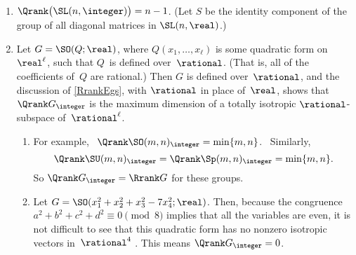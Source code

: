 \begin{egs} \ \label{QrankEg} 
 \noprelistbreak
	 \begin{enumerate}
	 
	 \item \label{QrankEg-SL}
	 $\Qrank \bigl( \SL(n,\integer) \bigr) = n-1$. (Let $S$ be the identity component of the group of all diagonal matrices in $\SL(n,\real)$.)
	
	 \item \label{QrankEg-SOQ}
	 Let $G = \SO(Q; \real)$, where $Q(x_1,\ldots,x_\ell)$
	is some quadratic form on~$\real^\ell$, such that $Q$~is
	defined over~$\rational$. (That is, all of the coefficients
	of~$Q$ are rational.) Then $G$ is defined over~$\rational$,
	and the discussion of \cref{RrankEgs}, with $\rational$
	in place of~$\real$, shows that $\Qrank G_{\integer} $ is
	the maximum dimension of a totally isotropic
	$\rational$-subspace of~$\rational^\ell$. 
	
		\begin{enumerate} \itemsep=\smallskipamount

		\item For example, 
		 \ $\Qrank  \SO(m,n)_{\integer} = \min\{m,n\} $. \ 
		 Similarly,
		 $$ \Qrank  \SU(m,n)_{\integer} 
		 = \Qrank  \Sp(m,n)_{\integer}  = \min\{m,n\} .$$
		 So $\Qrank G_\integer = \Rrank G$ for these groups.
		 
		 \item \label{QrankEg-SOQ-anis}
		 Let $G = \SO(x_1^2 + x_2^2 + x_3^2 - 7 x_4^2; \real)$.
		Then, because the congruence $a^2 + b^2 + c^2 + d^2 \equiv 0
		\pmod{8}$ implies that all the variables are even, it is not difficult
		to see that this quadratic form has no nonzero isotropic vectors in~$\rational^4$ . This means $\Qrank G_{\integer}  = 0$.
		

\end{enumerate}
\end{enumerate}
\end{egs}
